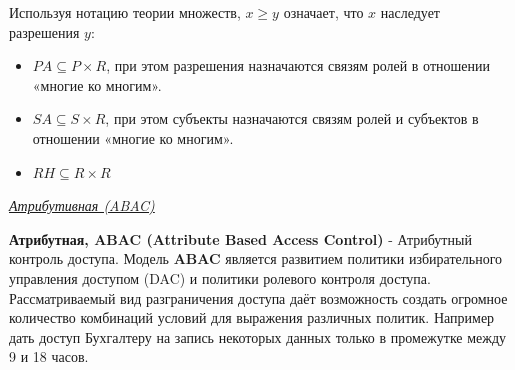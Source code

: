 Используя нотацию теории множеств, $x ≥ y$ означает, что $x$ наследует разрешения $y$:
\begin{itemize}
\item $PA \subseteq P \times R$, при этом разрешения назначаются связям ролей в отношении «многие ко многим».
\item $SA \subseteq S \times R$, при этом субъекты назначаются связям ролей и субъектов в отношении «многие ко многим».
\item $RH \subseteq R \times R$
\end{itemize}

\begin{center}
	\textit{\underline{Атрибутивная (ABAC)}}
\end{center}

\textbf{Атрибутная, ABAC (Attribute Based Access Control)} - Атрибутный контроль доступа. Модель \textbf{ABAC} является развитием политики избирательного управления доступом (DAC) и политики ролевого контроля доступа. Рассматриваемый вид разграничения доступа даёт возможность создать огромное количество комбинаций условий для выражения различных политик. Например дать доступ Бухгалтеру на запись некоторых данных только в промежутке между 9 и 18 часов.


